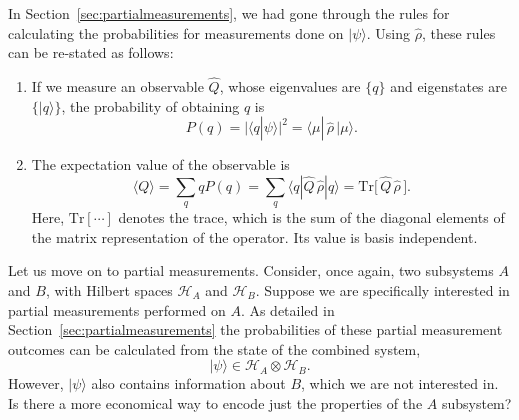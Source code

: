 \documentclass[pra,12pt]{revtex4-2}
\begin{document}
In Section~\ref{sec:partialmeasurements}, we had gone through the
rules for calculating the probabilities for measurements done on
$|\psi\rangle$.  Using $\hat{\rho}$, these rules can be re-stated as
follows:

\begin{enumerate}
\item If we measure an observable $\hat{Q}$, whose eigenvalues are
  $\{q\}$ and eigenstates are $\{|q\rangle\}$, the probability of
  obtaining $q$ is
  \begin{equation}
    P(q) = \big|\langle q | \psi\rangle\big|^2 =
    \langle \mu |\, \hat{\rho}\, | \mu \rangle.
    \label{Pi_rho}
  \end{equation}

\item The expectation value of the observable is
  \begin{equation}
    \langle Q\rangle
    = \sum_q q P(q)
    = \sum_q \langle q | \hat{Q}\, \hat{\rho}| q \rangle
    = \mathrm{Tr}\big[\,\hat{Q} \, \hat{\rho}\,\big].
    \label{Qexpt}
  \end{equation}
  Here, $\mathrm{Tr}[\cdots]$ denotes the trace, which is the sum of
  the diagonal elements of the matrix representation of the operator.
  Its value is basis independent.
\end{enumerate}

Let us move on to partial measurements.  Consider, once again, two
subsystems $A$ and $B$, with Hilbert spaces $\mathscr{H}_A$ and
$\mathscr{H}_B$.  Suppose we are specifically interested in partial
measurements performed on $A$.  As detailed in
Section~\ref{sec:partialmeasurements} the probabilities of these
partial measurement outcomes can be calculated from the state of the
combined system,
\begin{equation*}
  |\psi\rangle \in \mathscr{H}_A\otimes \mathscr{H}_B.
\end{equation*}
However, $|\psi\rangle$ also contains information about $B$, which we
are not interested in.  Is there a more economical way to encode just
the properties of the $A$ subsystem?
\end{document}
